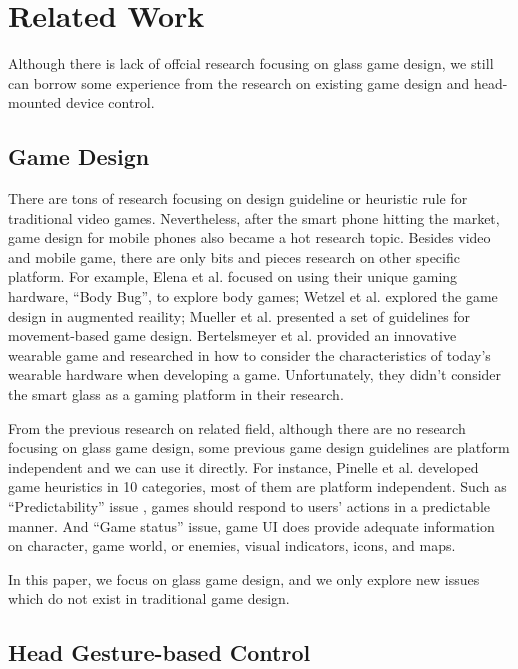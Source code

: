 \section{Related Work}

Although there is lack of offcial research focusing on glass game design, we still can borrow some experience from the research on existing game design and head-mounted device control.


\subsection{Game Design}

There are tons of research focusing on design guideline or heuristic rule for traditional video games\cite{gameflow,criticalreview,chi04game,09game,02game,08game,07game}. Nevertheless, after the smart phone hitting the market, game design for mobile phones also became a hot research topic\cite{mobilegame,mobile06,mobile08,icec06}. Besides video and mobile game, there are only bits and pieces research on other specific platform. For example, Elena et al. focused on using their unique gaming hardware, ``Body Bug'', to explore body games\cite{bodygame}; Wetzel et al. explored the game design in augmented reaility\cite{argame}; Mueller et al. presented a set of guidelines for movement-based game design\cite{movegame}. Bertelsmeyer et al. provided an innovative wearable game and researched in how to consider the characteristics of today's wearable hardware when developing a game\cite{wearable}. Unfortunately, they didn't consider the smart glass as a gaming platform in their research. 

From the previous research on related field, although there are no research focusing on glass game design, some previous game design guidelines are platform independent and we can use it directly. For instance, Pinelle et al.\cite{videogame} developed game heuristics in 10 categories, most of them are platform independent. 
Such as ``Predictability'' issue , games should respond to users' actions in a predictable manner. And ``Game status'' issue, game UI does provide adequate information on character, game world, or enemies, visual indicators, icons, and maps. 

In this paper, we focus on glass game design, and we only explore new issues which do not exist in traditional game design.


\subsection{Head Gesture-based Control}

